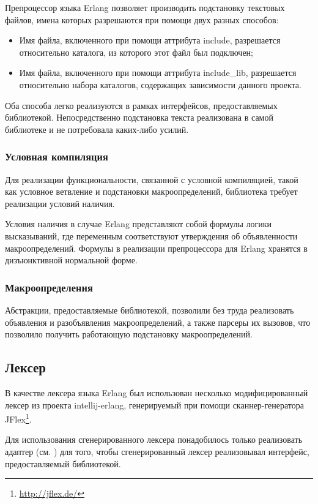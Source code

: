 Препроцессор языка Erlang позволяет производить подстановку текстовых файлов, имена которых разрешаются при помощи двух разных способов:

\begin{itemize}
\item Имя файла, включенного при помощи аттрибута include, разрешается относительно каталога, из которого этот файл был подключен;
\item Имя файла, включенного при помощи аттрибута include\_lib, разрешается относительно набора каталогов, содержащих зависимости данного проекта.
\end{itemize}

Оба способа легко реализуются в рамках интерфейсов, предоставляемых библиотекой. Непосредственно подстановка текста реализована в самой библиотеке и не потребовала каких-либо усилий.

\subsubsection{Условная компиляция}

Для реализации функциональности, связанной с условной компиляцией, такой как условное ветвление и подстановки макроопределений, библиотека требует реализации условий наличия.

Условия наличия в случае Erlang представляют собой формулы логики высказываний, где переменным соответствуют утверждения об объявленности макроопределений. Формулы в реализации препроцессора для Erlang хранятся в дизъюнктивной нормальной форме.

\subsubsection{Макроопределения}

Абстракции, предоставляемые библиотекой, позволили без труда реализовать объявления и разобъявления макроопределений, а также парсеры их вызовов, что позволило получить работающую подстановку макроопределений.

\subsection{Лексер}

В качестве лексера языка Erlang был использован несколько модифицированный лексер из проекта intellij-erlang, генерируемый при помощи сканнер-генератора JFlex\footnote{\url{http://jflex.de/}}.

Для использования сгенерированного лексера понадобилось только реализовать адаптер (см. \cite{gangoffouradapter}) для того, чтобы сгенерированный лексер реализовывал интерфейс, предоставляемый библиотекой.

